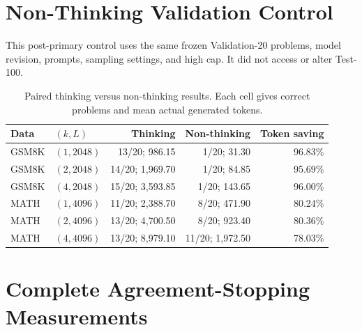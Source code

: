 \documentclass[runningheads]{llncs}
\begin{document}
\clearpage
\section{Non-Thinking Validation Control}

This post-primary control uses the same frozen Validation-20 problems, model
revision, prompts, sampling settings, and high cap. It did not access or alter
Test-100.

\begin{table}[!ht]
\centering
\caption{Paired thinking versus non-thinking results. Each cell gives correct
problems and mean actual generated tokens.}
\small
\begin{tabular}{llr@{\hspace{8pt}}r@{\hspace{8pt}}r}
\toprule
Data & $(k,L)$ & Thinking & Non-thinking & Token saving \\
\midrule
GSM8K & $(1,2048)$ & 13/20; 986.15 & 1/20; 31.30 & 96.83\% \\
GSM8K & $(2,2048)$ & 14/20; 1,969.70 & 1/20; 84.85 & 95.69\% \\
GSM8K & $(4,2048)$ & 15/20; 3,593.85 & 1/20; 143.65 & 96.00\% \\
MATH & $(1,4096)$ & 11/20; 2,388.70 & 8/20; 471.90 & 80.24\% \\
MATH & $(2,4096)$ & 13/20; 4,700.50 & 8/20; 923.40 & 80.36\% \\
MATH & $(4,4096)$ & 13/20; 8,979.10 & 11/20; 1,972.50 & 78.03\% \\
\bottomrule
\end{tabular}
\end{table}

\section{Complete Agreement-Stopping Measurements}
\end{document}
